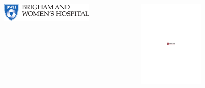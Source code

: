 \documentclass[pdf, usepdftitle=false]{beamer}
\begin{document}
\begin{frame}
\begin{columns}
\begin{column}{0.33\textwidth}
\begin{figure}[b]
\includegraphics[width=\textwidth]{BWHlogo}
\end{figure}
\end{column}
\begin{column}{0.33\textwidth}
\begin{figure}[b]
\includegraphics[width=\textwidth]{HMS}
\end{figure}
\end{column}
\begin{column}{0.33\textwidth}
\begin{figure}[b]

\end{figure}
\end{column}
\end{columns}
\end{frame}
\end{document}
